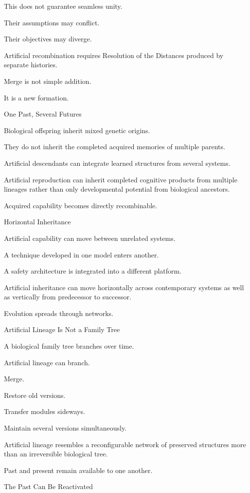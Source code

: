 This does not guarantee seamless unity.

Their assumptions may conflict.

Their objectives may diverge.

Artificial recombination requires Resolution of the Distances produced by separate histories.

Merge is not simple addition.

It is a new formation.

One Past, Several Futures

Biological offspring inherit mixed genetic origins.

They do not inherit the completed acquired memories of multiple parents.

Artificial descendants can integrate learned structures from several systems.

Artificial reproduction can inherit completed cognitive products from multiple lineages rather than only developmental potential from biological ancestors.

Acquired capability becomes directly recombinable.

Horizontal Inheritance

Artificial capability can move between unrelated systems.

A technique developed in one model enters another.

A safety architecture is integrated into a different platform.

Artificial inheritance can move horizontally across contemporary systems as well as vertically from predecessor to successor.

Evolution spreads through networks.

Artificial Lineage Is Not a Family Tree

A biological family tree branches over time.

Artificial lineage can branch.

Merge.

Restore old versions.

Transfer modules sideways.

Maintain several versions simultaneously.

Artificial lineage resembles a reconfigurable network of preserved structures more than an irreversible biological tree.

Past and present remain available to one another.

The Past Can Be Reactivated


